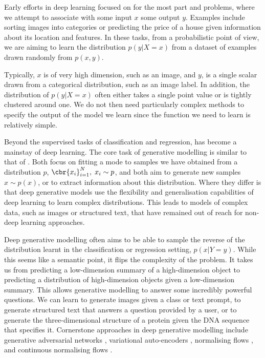 Early efforts in deep learning focused on for the most part  and  problems, where we attempt to associate with some input \({x}\) some output \(y\).
Examples include sorting images into categories or predicting the price of a house given information about its location and features.
In these tasks, from a probabilistic point of view, we are aiming to learn the distribution \(p(y | X=x)\) from a dataset of examples drawn randomly from \(p(x, y)\).

Typically, \(x\) is of very high dimension, such as an image, and \(y\), is a single scalar drawn from a categorical distribution, such as an image label.
In addition, the distribution of \(p(y | X=x)\) often either takes a single point value or is tightly clustered around one.
We do not then need particularly complex methods to specify the output of the model we learn since the function we need to learn is relatively simple.

Beyond the supervised tasks of classification and regression,  has become a mainstay of deep learning.
The core task of generative modelling is similar to that of .
Both focus on fitting a mode to samples we have obtained from a distribution \(p\), \(\cbr{x_i}_{i=1}^N, \; x_i \sim p\), and both aim to generate new samples \({x} \sim p({x})\), or to extract information about this distribution.
Where they differ is that deep generative models use the flexibility and generalisation capabilities of deep learning to learn complex distributions.
This leads to models of complex data, such as images or structured text, that have remained out of reach for non-deep learning approaches.

Deep generative modelling often aims to be able to sample the reverse of the distribution learnt in the classification or regression setting, \(p(x | Y=y)\).
While this seems like a semantic point, it flips the complexity of the problem. It takes us from predicting a low-dimension summary of a high-dimension object to predicting a distribution of high-dimension objects given a low-dimension summary.
This allows generative modelling to answer some incredibly powerful questions.
We can learn to generate images given a class or text prompt, to generate structured text that answers a question provided by a user, or to generate the three-dimensional structure of a protein given the DNA sequence that specifies it.
Cornerstone approaches in deep generative modelling include generative adversarial networks \cite{goodfellow2020generative}, variational auto-encoders \cite{kingma2013auto,rezende2014stochastic}, normalising flows \cite{rezende15variational,tabak2010density, tabak2013family}, and continuous normalising flows \cite{chen2018neural}.

